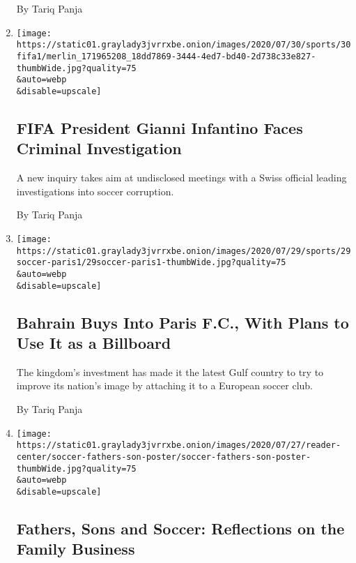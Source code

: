 \begin{enumerate}
  By Tariq Panja
\item
  \href{/2020/07/30/sports/soccer/fifa-gianni-infantino-investigation.html}{}

  \texttt{[image: https://static01.graylady3jvrrxbe.onion/images/2020/07/30/sports/30fifa1/merlin\_171965208\_18dd7869-3444-4ed7-bd40-2d738c33e827-thumbWide.jpg?quality=75\\\&auto=webp\\\&disable=upscale]}

  \hypertarget{fifa-president-gianni-infantino-faces-criminal-investigation}{%
  \subsection{FIFA President Gianni Infantino Faces Criminal
  Investigation}\label{fifa-president-gianni-infantino-faces-criminal-investigation}}

  A new inquiry takes aim at undisclosed meetings with a Swiss official
  leading investigations into soccer corruption.

  By Tariq Panja
\item
  \href{/2020/07/29/sports/soccer/paris-fc-bahrain.html}{}

  \texttt{[image: https://static01.graylady3jvrrxbe.onion/images/2020/07/29/sports/29soccer-paris1/29soccer-paris1-thumbWide.jpg?quality=75\\\&auto=webp\\\&disable=upscale]}

  \hypertarget{bahrain-buys-into-paris-fc-with-plans-to-use-it-as-a-billboard}{%
  \subsection{Bahrain Buys Into Paris F.C., With Plans to Use It as a
  Billboard}\label{bahrain-buys-into-paris-fc-with-plans-to-use-it-as-a-billboard}}

  The kingdom's investment has made it the latest Gulf country to try to
  improve its nation's image by attaching it to a European soccer club.

  By Tariq Panja
\item
  \href{/2020/07/28/sports/soccer/erling-haaland-gio-reyna-thuram.html}{}

  \texttt{[image: https://static01.graylady3jvrrxbe.onion/images/2020/07/27/reader-center/soccer-fathers-son-poster/soccer-fathers-son-poster-thumbWide.jpg?quality=75\\\&auto=webp\\\&disable=upscale]}

  \hypertarget{fathers-sons-and-soccer-reflections-on-the-family-business}{%
  \subsection{Fathers, Sons and Soccer: Reflections on the Family
  Business}\label{fathers-sons-and-soccer-reflections-on-the-family-business}}


\end{enumerate}
